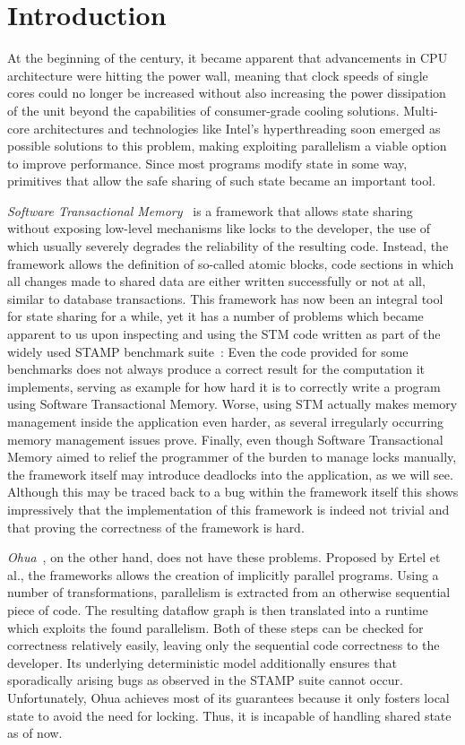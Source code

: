 %
\chapter{Introduction}
\label{sec:introduction}

At the beginning of the century, it became apparent that advancements in CPU architecture were hitting the power wall, meaning that clock speeds of single cores could no longer be increased without also increasing the power dissipation of the unit beyond the capabilities of consumer-grade cooling solutions.
Multi-core architectures and technologies like Intel's hyperthreading soon emerged as possible solutions to this problem, making exploiting parallelism a viable option to improve performance.
Since most programs modify state in some way, primitives that allow the safe sharing of such state became an important tool.

\emph{Software Transactional Memory}~\cite{shavit1997software} is a framework that allows state sharing without exposing low-level mechanisms like locks to the developer, the use of which usually severely degrades the reliability of the resulting code.
Instead, the framework allows the definition of so-called atomic blocks, code sections in which all changes made to shared data are either written successfully or not at all, similar to database transactions.
This framework has now been an integral tool for state sharing for a while, yet it has a number of problems which became apparent to us upon inspecting and using the STM code written as part of the widely used STAMP benchmark suite~\cite{minh2008stamp}:
Even the code provided for some benchmarks does not always produce a correct result for the computation it implements, serving as example for how hard it is to correctly write a program using Software Transactional Memory.
Worse, using STM actually makes memory management inside the application even harder, as several irregularly occurring memory management issues prove.
Finally, even though Software Transactional Memory aimed to relief the programmer of the burden to manage locks manually, the framework itself may introduce deadlocks into the application, as we will see.
Although this may be traced back to a bug within the framework itself this shows impressively that the implementation of this framework is indeed not trivial and that proving the correctness of the framework is hard.

\emph{Ohua}~\cite{ertel2015ohua}, on the other hand, does not have these problems.
Proposed by Ertel et al., the frameworks allows the creation of implicitly parallel programs.
Using a number of transformations, parallelism is extracted from an otherwise sequential piece of code.
The resulting dataflow graph is then translated into a runtime which exploits the found parallelism.
Both of these steps can be checked for correctness relatively easily, leaving only the sequential code correctness to the developer.
Its underlying deterministic model additionally ensures that sporadically arising bugs as observed in the STAMP suite cannot occur.
Unfortunately, Ohua achieves most of its guarantees because it only fosters local state to avoid the need for locking.
Thus, it is incapable of handling shared state as of now.

